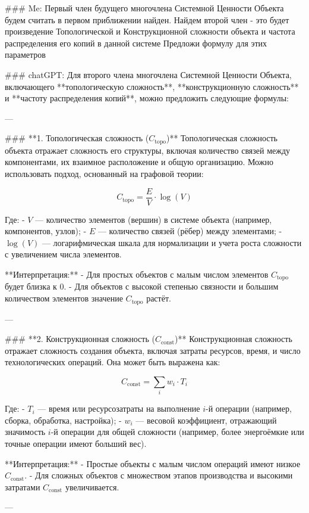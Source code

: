 ### Me:
Первый член будущего многочлена Системной Ценности Объекта будем считать в первом приближении найден.
Найдем второй член - это будет произведение Топологической и Конструкционной сложности объекта и частота распределения его копий в данной системе
Предложи формулу для этих параметров

### chatGPT:
Для второго члена многочлена Системной Ценности Объекта, включающего **топологическую сложность**, **конструкционную сложность** и **частоту распределения копий**, можно предложить следующие формулы:

---

### **1. Топологическая сложность (\( C_\text{topo} \))**
Топологическая сложность объекта отражает сложность его структуры, включая количество связей между компонентами, их взаимное расположение и общую организацию. Можно использовать подход, основанный на графовой теории:

\[
C_\text{topo} = \frac{E}{V} \cdot \log(V)
\]

Где:
- \( V \) — количество элементов (вершин) в системе объекта (например, компонентов, узлов);  
- \( E \) — количество связей (рёбер) между элементами;  
- \( \log(V) \) — логарифмическая шкала для нормализации и учета роста сложности с увеличением числа элементов.

**Интерпретация:**  
- Для простых объектов с малым числом элементов \( C_\text{topo} \) будет близка к 0.  
- Для объектов с высокой степенью связности и большим количеством элементов значение \( C_\text{topo} \) растёт.

---

### **2. Конструкционная сложность (\( C_\text{const} \))**
Конструкционная сложность отражает сложность создания объекта, включая затраты ресурсов, время, и число технологических операций. Она может быть выражена как:

\[
C_\text{const} = \sum_{i} w_i \cdot T_i
\]

Где:
- \( T_i \) — время или ресурсозатраты на выполнение \( i \)-й операции (например, сборка, обработка, настройка);  
- \( w_i \) — весовой коэффициент, отражающий значимость \( i \)-й операции для общей сложности (например, более энергоёмкие или точные операции имеют больший вес).

**Интерпретация:**  
- Простые объекты с малым числом операций имеют низкое \( C_\text{const} \).  
- Для сложных объектов с множеством этапов производства и высокими затратами \( C_\text{const} \) увеличивается.

---

